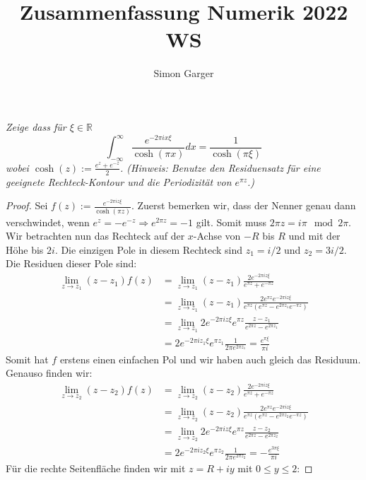 \documentclass[11pt]{article}
\title{Zusammenfassung Numerik 2022 WS}
\author{Simon Garger}
\newenvironment{problem}[2][Beispiel]{
    \begin{trivlist}
        \item[\hskip \labelsep {\bfseries #1}\hskip \labelsep {\bfseries #2.}] \itshape}{
    \end{trivlist}\normalshape
}
\begin{document}
    \begin{problem}{1}
        Zeige dass für $\xi \in \mathbb{R}$
        $$
        \int_{-\infty}^{\infty} \frac{e^{-2 \pi i x \xi}}{\cosh (\pi x)} d x=\frac{1}{\cosh (\pi \xi)}
        $$
        wobei $\cosh (z):=\frac{e^z+e^{-z}}{2}$.
        (Hinweis: Benutze den Residuensatz für eine geeignete Rechteck-Kontour und die Periodizität von $e^{\pi z}$.)
    \end{problem}

    \begin{proof}
        Sei $f(z):= \frac{e^{-2 \pi i z \xi}}{\cosh (\pi z)}$. Zuerst bemerken wir, dass der Nenner genau dann
        verschwindet, wenn $e^z = -e^{-z}\Rightarrow e^{2\pi z} = -1$ gilt. Somit muss $2\pi z = i\pi\mod 2\pi$.
        Wir betrachten nun das Rechteck auf der $x$-Achse von $-R$ bis $R$ und mit der Höhe bis $2i$.
        Die einzigen Pole in diesem Rechteck sind $z_1 = i/2$ und $z_2=3i/2$. Die Residuen dieser Pole sind:
        $$\begin{aligned}
              \lim_{z\to z_1}(z-z_1)f(z)
              &= \lim_{z\to z_1}(z-z_1)\frac{2 e^{-2\pi i z\xi}}{e^{\pi z}+e^{-\pi z}}\\
              &= \lim_{z\to z_1}(z-z_1)\frac{2e^{\pi z} e^{-2\pi i z\xi}}{e^{\pi z}(e^{\pi z}-e^{2\pi z_1}e^{-\pi z})}\\
              &= \lim_{z\to z_1}2 e^{-2\pi i z\xi}e^{\pi z}\frac{z-z_1}{e^{2\pi z}-e^{2\pi z_1}}\\
              &= 2 e^{-2\pi i z_1\xi}e^{\pi z_1}\frac{1}{2\pi e^{2\pi z_1}} = \frac{e^{\pi \xi}}{\pi i}
        \end{aligned}$$
        Somit hat $f$ erstens einen einfachen Pol und wir haben auch gleich das Residuum.
        Genauso finden wir:
        $$\begin{aligned}
              \lim_{z\to z_2}(z-z_2)f(z)
              &= \lim_{z\to z_2}(z-z_2)\frac{2 e^{-2\pi i z\xi}}{e^{\pi z}+e^{-\pi z}}\\
              &= \lim_{z\to z_2}(z-z_2)\frac{2e^{\pi z} e^{-2\pi i z\xi}}{e^{\pi z}(e^{\pi z}-e^{2\pi z_2}e^{-\pi z})}\\
              &= \lim_{z\to z_2}2 e^{-2\pi i z\xi}e^{\pi z}\frac{z-z_2}{e^{2\pi z}-e^{2\pi z_2}}\\
              &= 2 e^{-2\pi i z_2\xi}e^{\pi z_2}\frac{1}{2\pi e^{2\pi z_2}} = -\frac{e^{3\pi \xi}}{\pi i}
        \end{aligned}$$
        Für die rechte Seitenfläche finden wir mit $z=R+iy$ mit $0\leq y\leq 2$:

\end{proof}
\end{document}
